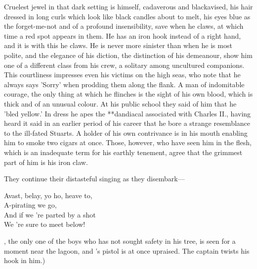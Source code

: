 \begin{stagedir}
Cruelest jewel in that dark setting is \hook himself, cadaverous and blackavised,
his hair dressed in long curls which look like black candles about to melt,
his eyes blue as the forget-me-not and of a profound insensibility,
save when he claws, at which time a red spot appears in them.
He has an iron hook instead of a right hand, and it is with this he claws.
He is never more sinister than when he is most polite,
and the elegance of his diction, the distinction of his demeanour,
show him one of a different class from his crew, a solitary among uncultured companions.
This courtliness impresses even his victims on the high seas,
who note that he always says 'Sorry' when prodding them along the flank.
A man of indomitable courage,
the only thing at which he flinches is the sight of his own blood, which is thick and of an unusual colour.
At his public school they said of him that he 'bled yellow.'
In dress he apes the **dandiacal associated with Charles II.,
having heard it said in an earlier period of his career that he bore a strange resemblance to the ill-fated Stuarts.
A holder of his own contrivance is in his mouth enabling him to smoke two cigars at once.
Those, however, who have seen him in the flesh, which is an inadequate term for his earthly tenement,
agree that the grimmest part of him is his iron claw.

They continue their distasteful singing as they disembark—

\begin{drama}
\speakercontinues
	Avast, belay, yo ho, heave to,\\
	A-pirating we go,\\
	And if we 're parted by a shot\\
	We 're sure to meet below!
\end{drama}

\nibs, the only one of the boys who has not sought safety in his tree, is seen for a moment near the lagoon,
and \starkey's pistol is at once upraised.
The captain twists his hook in him.)
\end{stagedir}

